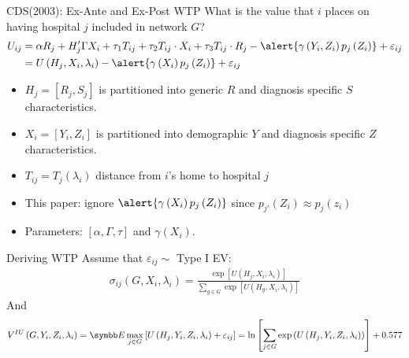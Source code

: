 \documentclass[aspectratio=169,10pt]{beamer}
\begin{document}
\begin{frame}{CDS(2003): Ex-Ante and Ex-Post WTP}
What is the value that $i$ places on having hospital $j$ included in network $G$?
\begin{align*}
U_{i j} &=\alpha R_{j}+H_{j}^{\prime} \Gamma X_{i}+\tau_{1} T_{i j}+\tau_{2} T_{i j} \cdot X_{i}+\tau_{3} T_{i j} \cdot R_{j}-\alert{\gamma\left(Y_{i}, Z_{i}\right) p_{j}\left(Z_{i}\right)}+\varepsilon_{i j} \\ &=U\left(H_{j}, X_{i}, \lambda_{i}\right)-\alert{\gamma\left(X_{i}\right) p_{j}\left(Z_{i}\right)}+\varepsilon_{i j}
\end{align*}

\begin{itemize}
\item $H_{j}=\left[R_{j}, S_{j}\right]$ is partitioned into generic $R$ and diagnosis specific $S$ characteristics.
\item $X_{i}=\left[Y_{i}, Z_{i}\right]$ is partitioned into demographic $Y$ and diagnosis specific $Z$ characteristics.
\item $T_{i j}=T_{j}\left(\lambda_{i}\right)$ distance from $i$'s home to hospital $j$
\item This paper: ignore $\alert{\gamma\left(X_{i}\right) p_{j}\left(Z_{i}\right)}$ since $p_{j'}(Z_i) \approx p_j(z_i)$
\item Parameters: $[\alpha,\Gamma, \tau]$ and $\gamma(X_i)$.
\end{itemize}
\end{frame} 


\begin{frame}{Deriving WTP}
Assume that $\varepsilon_{ij} \sim$ Type I EV:
\begin{align*}
\sigma_{ij}\left(G, X_{i}, \lambda_{i}\right)=\frac{\exp \left[U\left(H_{j}, X_{i}, \lambda_{i}\right)\right]}{\sum_{g \in G} \exp \left[U\left(H_{g}, X_{i}, \lambda_{i}\right)\right]}
\end{align*}
And
\begin{align*}
V^{I U}\left(G, Y_{i}, Z_{i}, \lambda_{i}\right)=\E \max _{j \in G}\left[U\left(H_{j}, Y_{i}, Z_{i}, \lambda_{i}\right)+\varepsilon_{i j}\right]=\ln \left[\sum_{j \in G} \exp \left(U\left(H_{j}, Y_{i}, Z_{i}, \lambda_{i}\right)\right)\right] + 0.577
\end{align*}
\end{frame}
\end{document}
